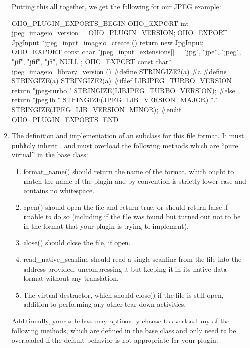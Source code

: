 \begin{enumerate}
  Putting this all together, we get the following for our JPEG example:

  \begin{code}
    OIIO_PLUGIN_EXPORTS_BEGIN
        OIIO_EXPORT int jpeg_imageio_version = OIIO_PLUGIN_VERSION;
        OIIO_EXPORT JpgInput *jpeg_input_imageio_create () {
            return new JpgInput;
        }
        OIIO_EXPORT const char *jpeg_input_extensions[] = {
            "jpg", "jpe", "jpeg", "jif", "jfif", "jfi", NULL
        };
        OIIO_EXPORT const char* jpeg_imageio_library_version () {
          #define STRINGIZE2(a) #a
          #define STRINGIZE(a) STRINGIZE2(a)
          #ifdef LIBJPEG_TURBO_VERSION
            return "jpeg-turbo " STRINGIZE(LIBJPEG_TURBO_VERSION);
          #else
            return "jpeglib " STRINGIZE(JPEG_LIB_VERSION_MAJOR) "." \\
                    STRINGIZE(JPEG_LIB_VERSION_MINOR);
          #endif
        }
    OIIO_PLUGIN_EXPORTS_END
  \end{code}

\item The definition and implementation of an \ImageInput subclass for
  this file format.  It must publicly inherit \ImageInput, and must
  overload the following methods which are ``pure virtual'' in the
  \ImageInput base class:

  \begin{enumerate}
    \item {\cf format_name()} should return the name of the format, which
      ought to match the name of the plugin and by convention is
      strictly lower-case and contains no whitespace.
    \item {\cf open()} should open the file and return true, or should
      return false if unable to do so (including if the file was found
      but turned out not to be in the format that your plugin is trying
      to implement).
    \item {\cf close()} should close the file, if open.
    \item {\cf read_native_scanline} should read a single scanline from
      the file into the address provided, uncompressing it but
      keeping it in its native data format without any translation.
    \item The virtual destructor, which should {\cf close()} if the file
      is still open, addition to performing any other tear-down activities.
  \end{enumerate}
  
  Additionally, your \ImageInput subclass may optionally choose to
  overload any of the following methods, which are defined in the
  \ImageInput base class and only need to be overloaded if the default
  behavior is not appropriate for your plugin:


\end{enumerate}
